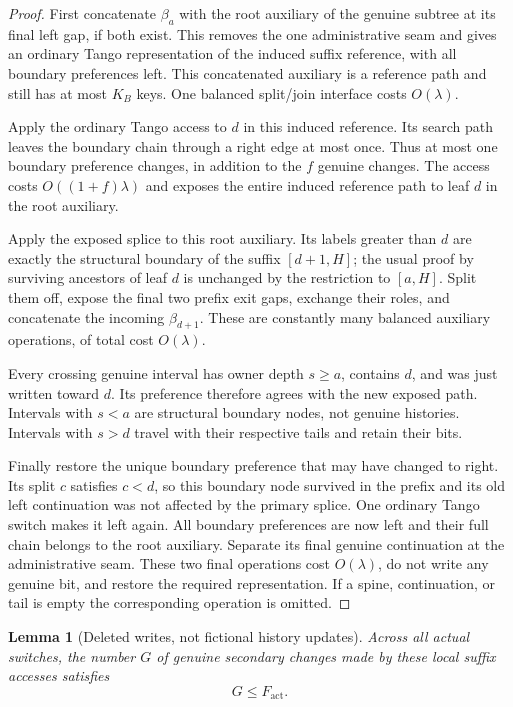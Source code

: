 \documentclass[11pt]{article}
\numberwithin{equation}{section}
\newtheorem{lemma}[theorem]{Lemma}
\begin{document}
\begin{proof}
First concatenate $\beta_a$ with the root auxiliary of the genuine
subtree at its final left gap, if both exist. This removes the one
administrative seam and gives an ordinary Tango representation of the
induced suffix reference, with all boundary preferences left. This
concatenated auxiliary is a reference path and still has at most $K_B$
keys. One balanced split/join interface costs $O(\lambda)$.

Apply the ordinary Tango access to $d$ in this induced reference. Its
search path leaves the boundary chain through a right edge at most
once. Thus at most one boundary preference changes, in addition to
the $f$ genuine changes. The access costs $O((1+f)\lambda)$ and exposes
the entire induced reference path to leaf $d$ in the root auxiliary.

Apply the exposed splice to this root auxiliary. Its labels greater
than $d$ are exactly the structural boundary of the suffix $[d+1,H]$;
the usual proof by surviving ancestors of leaf $d$ is unchanged by
the restriction to $[a,H]$. Split them off, expose the final two prefix
exit gaps, exchange their roles, and concatenate the incoming
$\beta_{d+1}$. These are constantly many balanced auxiliary operations,
of total cost $O(\lambda)$.

Every crossing genuine interval has owner depth $s\ge a$, contains
$d$, and was just written toward $d$. Its preference therefore agrees
with the new exposed path. Intervals with $s<a$ are structural boundary
nodes, not genuine histories. Intervals with $s>d$ travel with their
respective tails and retain their bits.

Finally restore the unique boundary preference that may have changed
to right. Its split $c$ satisfies $c<d$, so this boundary node survived
in the prefix and its old left continuation was not affected by the
primary splice. One ordinary Tango switch makes it left again. All
boundary preferences are now left and their full chain belongs to the
root auxiliary. Separate its final genuine continuation at the
administrative seam. These two final operations cost $O(\lambda)$,
do not write any genuine bit, and restore the required representation.
If a spine, continuation, or tail is empty the corresponding operation
is omitted.
\end{proof}

\begin{lemma}[Deleted writes, not fictional history updates]\label{comp:lem:deletion}
Across all actual switches, the number $G$ of genuine secondary
changes made by these local suffix accesses satisfies
\[
 G\le F_{\mathrm{act}}.
\]
\end{lemma}
\end{document}
